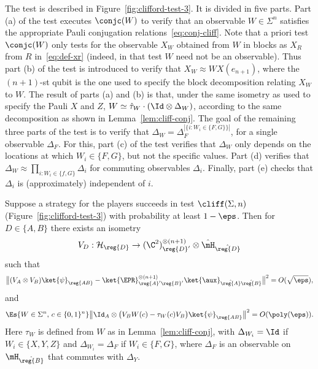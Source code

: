 The test is described in Figure~\ref{fig:clifford-test-3}. It is divided in five parts. Part (a) of the test executes  $\conjc(W)$ to verify that an observable $W\in\Sigma^n$ satisfies the appropriate Pauli conjugation relations~\eqref{eq:conj-cliff}. Note that a priori test $\conjc(W)$ only tests for the observable $X_W$ obtained from $W$ in blocks as $X_R$ from $R$ in~\eqref{eq:def-xr} (indeed, in that test $W$ need not be an observable). Thus part (b) of the test is introduced to verify that $X_W \approx W X(e_{n+1})$, where the $(n+1)$-st qubit is the one used to specify the block decomposition relating $X_W$ to $W$.  The result of parts (a) and (b) is that, under the same isometry as used to specify the Pauli $X$ and $Z$, $W\simeq \hat{\tau}_W \cdot (\Id\otimes \Delta_W)$, according to the same decomposition as shown in Lemma~\ref{lem:cliff-conj}. The goal of the remaining three parts of the test is to verify that $\Delta_W = \Delta_F^{|\{i: W_i \in \{F,G\}\}|}$, for a single observable $\Delta_F$. For this, part (c) of the test verifies that $\Delta_W$ only depends on the locations at which $W_i\in\{F,G\}$, but not the specific values. Part (d) verifies that $\Delta_W \approx \prod_{i: W_i\in \{f,G\}} \Delta_i $ for commuting observables $\Delta_i$. Finally, part (e) checks that $\Delta_i$ is (approximately) independent of $i$. 

\begin{theorem}\label{thm:clifford-ntest}
Suppose a strategy for the players succeeds in test $\cliff(\Sigma,n)$ (Figure~\ref{fig:clifford-test-3}) with probability at least $1-\eps$. Then  for $D\in\{A,B\}$ there exists an isometry 
$$V_D: \mathcal{H}_\reg{D} \to (\C^2)^{\otimes (n+1)}_{\reg{D}'} \otimes \hat{\mH}_{\hat{\reg{D}}}$$
such that 
\begin{equation}\label{eq:psi-epr}
\big\| (V_A \otimes V_B) \ket{\psi}_{\reg{AB}} - \ket{\EPR}_{\reg{A}'\reg{B}'}^{\otimes (n+1)} \ket{\aux}_{\hat{\reg{A}}\hat{\reg{B}}} \big\|^2 = O(\sqrt{\eps}),
\end{equation}
and %
\begin{equation}\label{eq:clifford-ntest-close}
\Es{W\in\Sigma^n,\,c\in\{0,1\}^n} \big\| \Id_A \otimes \big( V_B W(c) - \tau_{W}(c) V_B\big)   \ket{\psi}_{\reg{AB}} \big\|^2 = O(\poly(\eps)).
\end{equation}
Here $\tau_W$ is defined from $W$ as in Lemma~\ref{lem:cliff-conj}, with $\Delta_{W_i} = \Id$ if $W_i\in \{X,Y,Z\}$ and $\Delta_{W_i} = \Delta_F$ if $W_i\in\{F,G\}$, where $\Delta_F$ is an  observable on ${\mH}_{\hat{\reg{B}}}$ that commutes with $\Delta_Y$. 
\end{theorem}

